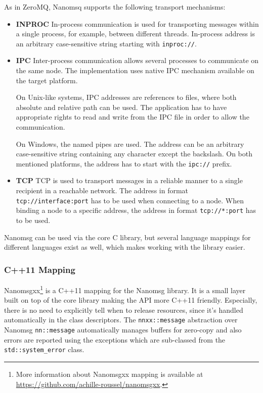 As in ZeroMQ, Nanomsq supports the following transport mechanisms:
\begin{itemize}
	\item \textbf{INPROC} \newline
	In-process communication is used for transporting messages within a single process, for example, between different threads. In-process address is an arbitrary case-sensitive string starting with \texttt{inproc://}.
	\item \textbf{IPC}  \newline 
	Inter-process communication allows several processes to communicate on the same node. The implementation uses native IPC mechanism available on the target platform. 
	
	On Unix-like systems, IPC addresses are references to files, where both absolute and relative path can be used. The application has to have appropriate rights to read and write from the IPC file in order to allow the communication.
	
	 On Windows, the named pipes are used. The address can be an arbitrary case-sensitive string containing any character except the backslash. On both mentioned platforms, the address has to start with the \texttt{ipc://} prefix.
	\item \textbf{TCP} \newline
	TCP is used to transport messages in a reliable manner to a single recipient in a reachable network. The address in format \texttt{tcp://interface:port} has to be used when connecting to a node. When binding a node to a specific address, the address in format \texttt{tcp://*:port} has to be used.
\end{itemize}

Nanomsg can be used via the core C library, but several language mappings for different languages exist as well, which makes working with the library easier.
\subsubsection{C++11 Mapping}
Nanomsgxx\footnote{More information about Nanomsgxx mapping is available at \url{https://github.com/achille-roussel/nanomsgxx}.} is a C++11 mapping for the Nanomsg library. It is a small layer built on top of the core library making the API more C++11  friendly. Especially, there is no need to explicitly tell when to release resources, since it's handled automatically in the class descriptors. The \texttt{nnxx::message} abstraction over Nanomsg \texttt{nn::message} automatically manages buffers for zero-copy and also errors are reported using the exceptions which are sub-classed from the \texttt{std::system\_error} class.
